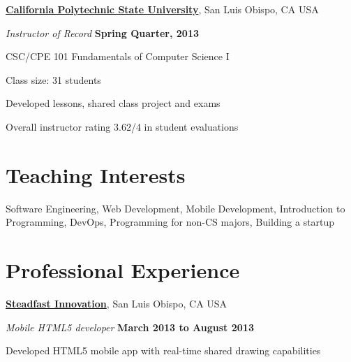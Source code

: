 \documentclass[10pt]{article}
\begin{document}
\href{http://www.calpoly.edu/}{\textbf{California Polytechnic State University}},
San Luis Obispo, CA USA
\begin{outerlist}
\item[] \textit{Instructor of Record}%
    \hfill \textbf{Spring Quarter, 2013 }
    \begin{innerlist}%
       \item CSC/CPE 101 Fundamentals of Computer Science I %
       \item Class size: 31 students 
       \item Developed lessons, shared class project and exams
       \item Overall instructor rating 3.62/4 in student evaluations
\end{innerlist}

\end{outerlist}




\section{Teaching Interests}

Software Engineering,
Web Development,
Mobile Development,
Introduction to Programming,
DevOps,
Programming for non-CS majors,
Building a startup

\vspace{-5pt}







\section{Professional Experience}

\href{http://steadfastinnovation.com/}{\textbf{Steadfast Innovation}},
San Luis Obispo, CA USA
\begin{outerlist}
\item[] \textit{Mobile HTML5 developer}%
    \hfill \textbf{March 2013 to August 2013}%
    \begin{innerlist}
    \item Developed HTML5 mobile app with real-time shared drawing capabilities 
    \end{innerlist}
\end{outerlist}
\end{document}
